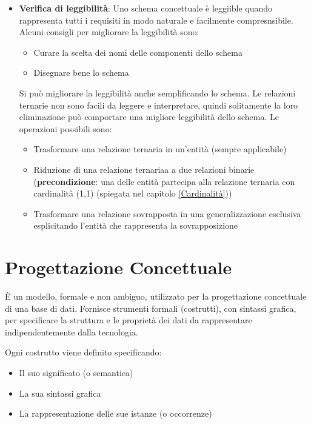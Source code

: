 \documentclass[a4paper,twoside]{article}
\begin{document}
\begin{itemize}
  \item \textbf{Verifica di leggibilità}: Uno schema concettuale è leggiible quando
    rappresenta tutti i requisiti in modo naturale e facilmente compresnsibile. Alcuni
    consigli per migliorare la leggibilità sono:
    \begin{itemize}
      \item Curare la scelta dei nomi delle componenti dello schema
      \item Disegnare bene lo schema
    \end{itemize}
    Si può migliorare la leggibilità anche semplificando lo schema. Le relazioni
    ternarie non sono facili da leggere e interpretare, quindi solitamente la loro
    eliminazione può comportare una migliore leggibilità dello schema.
    Le operazioni possibili sono:
    \begin{itemize}
      \item Trasformare una relazione ternaria in un'entità (sempre applicabile)
      \item Riduzione di una relazione ternariaa a due relazioni binarie\\
        (\textbf{precondizione}: una delle entità partecipa alla relazione ternaria
        con cardinalità (1,1) (spiegata nel capitolo \ref{Cardinalità})) 
      \item Trasformare una relazione sovrapposta in una generalizzazione esclusiva
        esplicitando l'entità che rappresenta la sovrapposizione
    \end{itemize}
\end{itemize}

\section{Progettazione Concettuale}
È un modello, formale e non ambiguo, utilizzato per la progettazione concettuale di una
base di dati. Fornisce strumenti formali (costrutti), con sintassi grafica, per specificare la
struttura e le proprietà dei dati da rappresentare indipendentemente dalla tecnologia.

\vspace{1em}
\noindent
Ogni costrutto viene definito specificando:
\begin{itemize}
  \item Il suo significato (o semantica)
  \item La sua sintassi grafica
  \item La rappresentazione delle sue istanze (o occorrenze)
\end{itemize}
\end{document}
